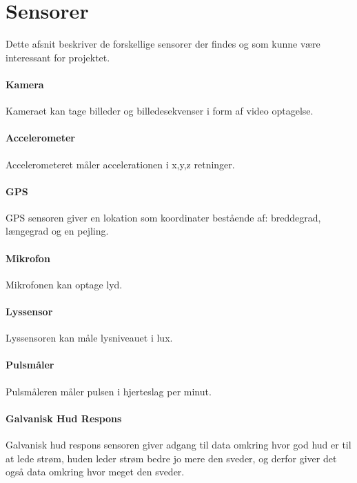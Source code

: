 \section{Sensorer}
Dette afsnit beskriver de forskellige sensorer der findes og som kunne være interessant for projektet. 

\paragraph{Kamera}
Kameraet kan tage billeder og billedesekvenser i form af video optagelse.

\paragraph{Accelerometer}
Accelerometeret måler accelerationen i x,y,z retninger.

\paragraph{GPS}
GPS sensoren giver en lokation som koordinater bestående af: breddegrad, længegrad og en pejling.

\paragraph{Mikrofon}
Mikrofonen kan optage lyd.

\paragraph{Lyssensor}
Lyssensoren kan måle lysniveauet i lux.

\paragraph{Pulsmåler}
Pulsmåleren måler pulsen i hjerteslag per minut.

\paragraph{Galvanisk Hud Respons}
Galvanisk hud respons sensoren giver adgang til data omkring hvor god hud er til at lede strøm, huden leder strøm bedre jo mere den sveder, og derfor giver det også data omkring hvor meget den sveder.